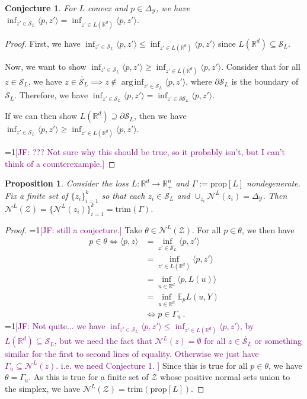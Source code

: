 \documentclass[12pt]{article}
\newcommand{\Comments}{1}
\newcommand{\mynote}[2]{\ifnum\Comments=1\textcolor{#1}{#2}\fi}
\newcommand{\jessie}[1]{\mynote{purple}{[JF: #1]}}
\newcommand{\reals}{\mathbb{R}}
\newcommand{\prop}[1]{\mathrm{prop}[#1]}
\newcommand{\simplex}{\Delta_\Y}
\newcommand{\E}{\mathbb{E}}
\newcommand{\N}{\mathcal{N}}
\renewcommand{\S}{\mathcal{S}}
\newcommand{\Y}{\mathcal{Y}}
\newcommand{\inprod}[2]{\langle #1, #2 \rangle}%
\newcommand{\inter}[1]{\mathring{#1}}%
\newcommand{\trim}{\mathrm{trim}}
\DeclareMathOperator*{\arginf}{arg\,inf}
\newtheorem{proposition}{Proposition}
\newtheorem{conjecture}{Conjecture}
\begin{document}
\begin{conjecture}
	For $L$ convex and $p \in \simplex$, we have $\inf_{z' \in \S_L} \inprod{p}{z'} = \inf_{z' \in L(\reals^d)}\inprod{p}{z'}$.
\end{conjecture}
\begin{proof}
	First, we have $\inf_{z' \in \S_L} \inprod{p}{z'} \leq \inf_{z' \in L(\reals^d)}\inprod{p}{z'}$ since $L(\reals^d) \subseteq \S_L$.
	
	Now, we want to show $\inf_{z' \in \S_L} \inprod{p}{z'} \geq \inf_{z' \in L(\reals^d)}\inprod{p}{z'}$.
	Consider that for all $z \in \S_L$, we have $z \in \inter{\S_L} \implies z \not \in \arginf_{z' \in \S_L}\inprod{p}{z'}$, where $\partial \S_L$ is the boundary of $\S_L$.
	Therefore, we have $\inf_{z' \in \S_L}\inprod{p}{z'} = \inf_{z' \in \partial\S_L}\inprod{p}{z'}$.
	
	If we can then show $L(\reals^d) \supseteq \partial \S_L$, then we have $\inf_{z' \in \S_L} \inprod{p}{z'} \geq \inf_{z' \in L(\reals^d)}\inprod{p}{z'}$.

	\jessie{??? Not sure why this should be true, so it probably isn't, but I can't think of a counterexample.}
\end{proof}

\begin{proposition}
	Consider the loss $L:\reals^d \to \reals^n_+$ and $\Gamma := \prop{L}$ nondegenerate.
	Fix a finite set of $\{z_i\}_{i=1}^k$ so that each $z_i \in \S_L$ and $\cup_{z_i} \N^L(z_i) = \simplex$.
	Then $\N^L(\mathcal{Z}) = \{\N^L(z_i)\}_{i=1}^k = \trim(\Gamma)$.
\end{proposition}
\begin{proof}
  \jessie{still a conjecture.}
  Take $\theta \in \N^L(\mathcal{Z})$.
  For all $p \in \theta$, we then have 
  \begin{align*}
  p \in \theta \iff \inprod{p}{z} &= \inf_{z' \in \S_L} \inprod{p}{z'}\\
  &= \inf_{z' \in L(\reals^d)} \inprod{p}{z'}\\
  &= \inf_{u \in \reals^d} \inprod{p}{L(u)}\\
  &= \inf_{u\in \reals^d} \E_p L(u, Y)\\
  &\iff p \in \Gamma_u~.~
  \end{align*}
  \jessie{Not quite... we have $\inf_{z' \in \S_L} \inprod{p}{z'} \leq \inf_{z' \in L(\reals^d)} \inprod{p}{z'}$, by $L(\reals^d) \subseteq \S_L$, but we need the fact that $\N^L(z) = \emptyset$ for all $z \in \inter{\S_L}$ or something similar for the first to second lines of equality.  Otherwise we just have $\Gamma_u \subseteq \N^L(z)$.  i.e. we need Conjecture 1.
  }
  Since this is true for all $p \in \theta$, we have $\theta = \Gamma_u$.
  As this is true for a finite set of $\mathcal{Z}$ whose positive normal sets union to the simplex, we have $\N^L(\mathcal{Z}) = \trim(\prop{L})$.
\end{proof}
\end{document}
